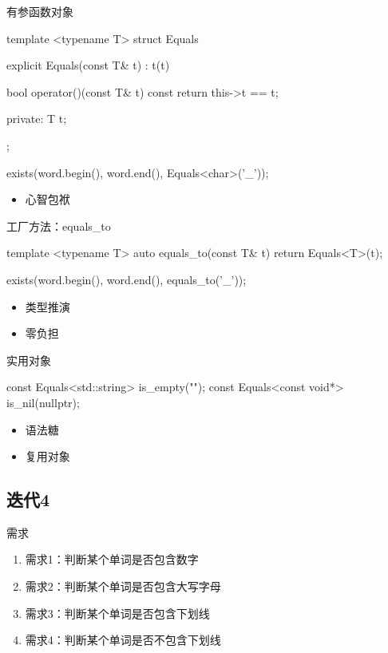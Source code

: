 \begin{frame}[fragile]{有参函数对象}
  \begin{c++}
  template <typename T>
  struct Equals {
    explicit Equals(const T& t) : t(t)
    {}

    bool operator()(const T& t) const {
      return this->t == t;
    }

  private:
    T t;
  };

  exists(word.begin(), word.end(), Equals<char>('_'));
  \end{c++}

  \begin{itemize}
    \item \alert{心智包袱}
  \end{itemize}
\end{frame}

\begin{frame}[fragile]{工厂方法：equals\_to}
  \begin{c++}
  template <typename T>
  auto equals_to(const T& t) {
    return Equals<T>(t);
  }

  exists(word.begin(), word.end(), equals_to('_'));
  \end{c++}

  \begin{itemize}
    \item \alert{类型推演}    
    \item \alert{零负担}
  \end{itemize}  
\end{frame}

\begin{frame}[fragile]{实用对象}
  \begin{c++}
  const Equals<std::string> is_empty("");
  const Equals<const void*> is_nil(nullptr);
  \end{c++}

  \begin{itemize}
    \item \alert{语法糖}    
    \item \alert{复用对象}
  \end{itemize}  
\end{frame}

\subsection{迭代4}

\begin{frame}{需求}
  \begin{block}{}
    \begin{enumerate}
    \item \alert{需求1}：判断某个单词是否包含数字
    \item \alert{需求2}：判断某个单词是否包含大写字母
    \item \alert{需求3}：判断某个单词是否包含下划线 
    \item<alert@1-> 需求4：判断某个单词是否不包含下划线     
    \end{enumerate}
  \end{block}
\end{frame}

